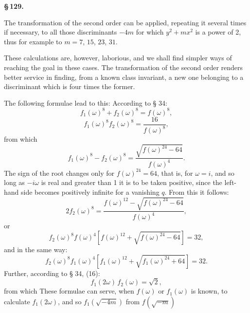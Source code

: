\textbf{§\,129. }

The transformation of the second order can be applied, repeating it
several times if necessary, to all those discriminants
$-4m$ for which $y^2 + m x^2$ is a power of 2, thus
for example to $m = 7$, $15$, $23$, $31$.

These calculations are, however, laborious, and we shall find
simpler ways of reaching the goal in these cases.
The transformation of the second order renders better service in
finding, from a known class invariant, a new one belonging to
a discriminant which is four times the former.

The following formulae lead to this:
According to § 34:
\[
f_1(\omega)^8 + f_2(\omega)^8 = f(\omega)^8,
\]
\[
f_1(\omega)^8 f_2(\omega)^8 = \frac{16}{f(\omega)^8},
\]
from which
\[
f_1(\omega)^8 - f_2(\omega)^8 = \frac{\sqrt{f(\omega)^{24} - 64}}{f(\omega)^4}.
\]
The sign of the root changes only for $f(\omega)^{24} = 64$,
that is, for $\omega = i$, and so long as $-i\omega$ is real and greater than 1
it is to be taken positive, since the left-hand side becomes
positively infinite for a vanishing $q$. From this it follows:
\[
2 f_2(\omega)^8 = \frac{f(\omega)^{12} - \sqrt{f(\omega)^{24} - 64}}{f(\omega)^4},
\]
or
\[
f_2(\omega)^8 f(\omega)^4 \left[f(\omega)^{12} + \sqrt{f(\omega)^{24} - 64}\right] = 32,
\]
and in the same way:
\[
f_2(\omega)^8 f_1(\omega)^4 \left[f_1(\omega)^{12} + \sqrt{f_1(\omega)^{24} + 64}\right] = 32.
\]
Further, according to § 34, (16):
\[
f_1(2\omega)\,f_2(\omega) = \sqrt{2},
\]
from which
These formulae can serve, when $f(\omega)$ or $f_1(\omega)$ is
known, to calculate $f_1(2\omega)$, and so $f_1(\sqrt{-4m})$ from $f(\sqrt{-m})$

